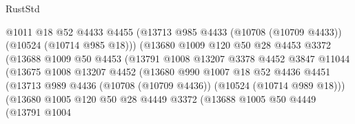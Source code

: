 \begin{lexlean}{RustStd}
\begin{coremodule}
                                @1011
                                @18
                                @52
                                @4433
                                @4455
                                (@13713
                                  @985
                                  @4433
                                  (@10708 (@10709 @4433))
                                  (@10524 (@10714 @985 @18)))
                                (@13680
                                  @1009
                                  @120
                                  @50
                                  @28
                                  @4453
                                  @3372
                                  (@13688
                                    @1009
                                    @50
                                    @4453
                                    (@13791
                                      @1008
                                      @13207
                                      @3378
                                      @4452
                                      @3847
                                      @11044
                                      (@13675
                                        @1008
                                        @13207
                                        @4452
                                        (@13680
                                          @990
                                          @1007
                                          @18
                                          @52
                                          @4436
                                          @4451
                                          (@13713
                                            @989
                                            @4436
                                            (@10708 (@10709 @4436))
                                            (@10524 (@10714 @989 @18)))
                                          (@13680
                                            @1005
                                            @120
                                            @50
                                            @28
                                            @4449
                                            @3372
                                            (@13688
                                              @1005
                                              @50
                                              @4449
                                              (@13791
                                                @1004

\end{coremodule}
\end{lexlean}
